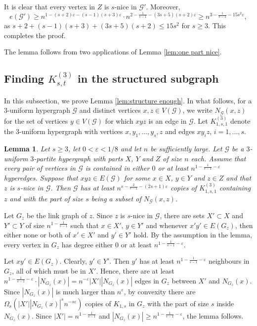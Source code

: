 \documentclass[a4paper,11pt]{article}
\makeatletter
\renewenvironment{proof}[1][\proofname] {\par\pushQED{\qed}\normalfont\topsep6\p@\@plus6\p@\relax\trivlist\item[\hskip\labelsep\bfseries#1\@addpunct{.}]\ignorespaces}{\popQED\endtrivlist\@endpefalse}
\newtheorem{lemma}[theorem]{\bf Lemma}
\theoremstyle{definition}
\def\eps{\varepsilon}
\def\cG{\mathcal{G}}
\makeatother
\begin{document}
\begin{proof}
    It is clear that every vertex in $Z$ is $s$-nice in $\cG'$. Moreover, $$e(\cG')\geq n^{1-(s+2)\eps-(s-1)(s+3)\eps} \cdot n^{2-\frac{1}{s-1}-(3s+5)(s+2)\eps}\geq n^{3-\frac{1}{s-1}-15s^2\eps},$$ 
    as $s+2+(s-1)(s+3)+(3s+5)(s+2) \leq 15s^2$ for $s \geq 3$. This completes the proof. 
\end{proof}

\begin{proof}[Proof of Lemma \ref{lem:find structure}]
    The lemma follows from two applications of Lemma \ref{lem:one part nice}.
\end{proof}

\subsection{Finding $K_{s,t}^{(3)}$ in the structured subgraph} \label{subsec:enough}

In this subsection, we prove Lemma \ref{lem:structure enough}. In what follows, for a $3$-uniform hypergraph $\cG$ and distinct vertices $x,z\in V(\cG)$, we write $N_{\cG}(x,z)$ for the set of vertices $y\in V(\cG)$ for which $xyz$ is an edge in $\cG$. Let $K_{1,s,1}^{(3)}$ denote the $3$-uniform hypergraph with vertices $x,y_1,\dots,y_s,z$ and edges $xy_iz$, $i = 1,\dots,s$. 
  
\begin{lemma} \label{lem:many K1s1}
   Let $s\geq 3$, let $0<\eps<1/8$ and let $n$ be sufficiently large. Let $\cG$ be a $3$-uniform $3$-partite hypergraph with parts $X$, $Y$ and $Z$ of size $n$ each. Assume that every pair of vertices in $\cG$ is contained in either $0$ or at least $n^{1-\frac{1}{s-1}-\eps}$ hyperedges. Suppose that $xyz\in E(\cG)$ for some $x\in X$, $y\in Y$ and $z\in Z$ and that $z$ is $s$-nice in $\cG$. Then $\cG$ has at least $n^{s-\frac{2}{s-1}-(2s+1)\eps}$ copies of $K_{1,s,1}^{(3)}$ containing $z$ and with the part of size $s$ being a subset of $N_{\cG}(x,z)$.
\end{lemma}

\begin{proof}
    Let $G_z$ be the link graph of $z$.
    Since $z$ is $s$-nice in $\cG$, there are sets $X'\subset X$ and $Y'\subset Y$ of size $n^{1-\frac{1}{s-1}}$ such that $x\in X'$, $y\in Y'$ and whenever $x'y'\in E(G_z)$, then either none or both of $x'\in X'$ and $y'\in Y'$ hold. By the assumption in the lemma, every vertex in $G_z$ has degree either 0 or at least $n^{1-\frac{1}{s-1}-\eps}$.
    
    Let $xy'\in E(G_z)$. Clearly, $y'\in Y'$. Then $y'$ has at least $n^{1-\frac{1}{s-1}-\eps}$ neighbours in $G_z$, all of which must be in $X'$. Hence, there are at least $n^{1-\frac{1}{s-1}-\eps} \cdot |N_{G_z}(x)| = n^{-\eps}|X'||N_{G_z}(x)|$ edges in $G_z$ between $X'$ and $N_{G_z}(x)$. Since $|N_{G_z}(x)|$ is much larger than $n^{\eps}$, by convexity there are $\Omega_s(|X'||N_{G_z}(x)|^sn^{-s\eps})$ copies of $K_{1,s}$ in $G_z$ with the part of size $s$ inside $N_{G_z}(x)$. Since $|X'|=n^{1-\frac{1}{s-1}}$ and $|N_{G_z}(x)|\geq n^{1-\frac{1}{s-1}-\eps}$, the lemma follows.
\end{proof}
\end{document}
